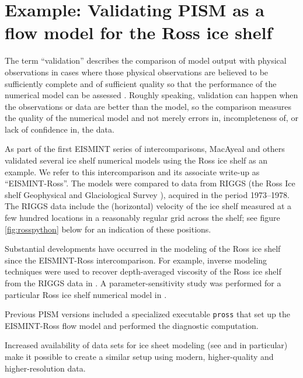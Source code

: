 
\section{Example: Validating PISM as a flow model for the Ross ice shelf}\label{sec:ross}   

The term ``validation'' describes the comparison of model output with physical observations in cases where those physical observations are believed to be sufficiently complete and of sufficient quality so that the performance of the numerical model can be assessed \cite{Roache,Wesseling}.  Roughly speaking, validation can happen when the observations or data are better than the model, so the comparison measures the quality of the numerical model and not merely errors in, incompleteness of, or lack of confidence in, the data.

As part of the first EISMINT series of intercomparisons, MacAyeal and others \cite{MacAyealetal} validated several ice shelf numerical models using the Ross ice shelf as an example.  We refer to this intercomparison and its associate write-up \cite{MacAyealetal} as ``EISMINT-Ross''.  The models were compared to data from RIGGS (the Ross Ice shelf Geophysical and Glaciological Survey \cite{RIGGS2,RIGGS1}), acquired in the period 1973--1978.   The RIGGS data include the (horizontal) velocity of the ice shelf measured at a few hundred locations in a reasonably regular grid across the shelf; see figure \ref{fig:rosspython} below for an indication of these positions.

Substantial developments have occurred in the modeling of the Ross ice shelf since the EISMINT-Ross intercomparison.  For example, inverse modeling techniques were used to recover depth-averaged viscosity of the Ross ice shelf from the RIGGS data in \cite{RommelaereMacAyeal}. A parameter-sensitivity study was performed for a particular Ross ice shelf numerical model in \cite{HumbertGreveHutter}.

Previous PISM versions included a specialized executable \texttt{pross} that set up the EISMINT-Ross flow model and performed the diagnostic computation.

Increased availability of data sets for ice sheet modeling (see \cite{LeBrocqetal2010} and \cite{Rignot09092011} in particular) make it possible to create a similar setup using modern, higher-quality and higher-resolution data.

